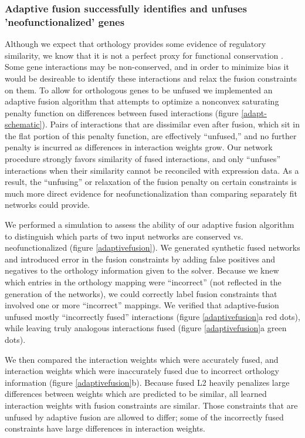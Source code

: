 \documentclass[11pt]{article}
\begin{document}
\subsubsection{Adaptive fusion successfully identifies and unfuses 'neofunctionalized' genes}
Although we expect that orthology provides some evidence of regulatory similarity, we know that it is not a perfect proxy for functional conservation \cite{gabaldon_functional_2013, studer_how_2009, nehrt_testing_2011}. Some gene interactions may be non-conserved, and in order to minimize bias it would be desireable to identify these interactions and relax the fusion constraints on them. To allow for orthologous genes to be unfused we implemented an adaptive fusion algorithm that attempts to optimize a nonconvex saturating penalty function on differences between fused interactions (figure \ref{adapt-schematic}). 
Pairs of interactions that are dissimilar even after fusion, which sit in the flat portion of this penalty function, are effectively ``unfused,'' and no further penalty is incurred as differences in interaction weights grow. 
Our network procedure strongly favors similarity of fused interactions, and only ``unfuses'' interactions when their similarity cannot be reconciled with expression data. 
As a result, the ``unfusing'' or relaxation of the fusion penalty on certain constraints is much more direct evidence for neofunctionalization than comparing separately fit networks could provide. 

We performed a simulation to assess the ability of our adaptive fusion algorithm to distinguish which parts of two input networks are conserved vs. neofunctionalized (figure \ref{adaptivefusion}). We generated synthetic fused networks and introduced error in the fusion constraints by adding false positives and negatives to the orthology information given to the solver. 
Because we knew which entries in the orthology mapping were ``incorrect'' (not reflected in the generation of the networks), we could correctly label fusion constraints that involved one or more ``incorrect'' mappings. 
We verified that adaptive-fusion unfused mostly ``incorrectly fused'' interactions (figure \ref{adaptivefusion}a red dots), while leaving truly analogous interactions fused (figure \ref{adaptivefusion}a green dots). 

We then compared the interaction weights which were accurately fused, and interaction weights which were inaccurately fused due to incorrect orthology information (figure \ref{adaptivefusion}b). Because fused L2 heavily penalizes large differences between weights which are predicted to be similar, all learned interaction weights with fusion constraints are similar. Those constraints that are unfused by adaptive fusion are allowed to differ; some of the incorrectly fused constraints have large differences in interaction weights. 
\end{document}
